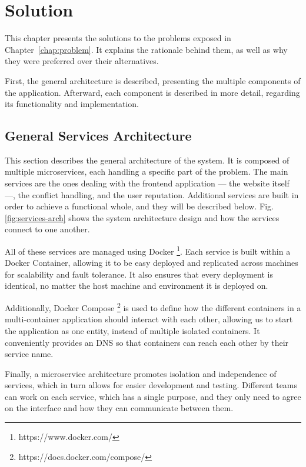 \chapter{Solution}\label{chap:solution}

This chapter presents the solutions to the problems exposed in Chapter~\ref{chap:problem}. It explains the rationale behind them, as well as why they were preferred over their alternatives.

First, the general architecture is described, presenting the multiple components of the application. Afterward, each component is described in more detail, regarding its functionality and implementation.

\section{General Services Architecture}

This section describes the general architecture of the system. It is composed of multiple microservices, each handling a specific part of the problem. The main services are the ones dealing with the frontend application --- the website itself ---, the conflict handling, and the user reputation. Additional services are built in order to achieve a functional whole, and they will be described below. Fig. \ref{fig:services-arch} shows the system architecture design and how the services connect to one another.

All of these services are managed using Docker \footnote{https://www.docker.com/}. Each service is built within a Docker Container, allowing it to be easy deployed and replicated across machines for scalability and fault tolerance. It also ensures that every deployment is identical, no matter the host machine and environment it is deployed on.

Additionally, Docker Compose \footnote{https://docs.docker.com/compose/} is used to define how the different containers in a multi-container application should interact with each other, allowing us to start the application as one entity, instead of multiple isolated containers. It conveniently provides an DNS so that containers can reach each other by their service name.

Finally, a microservice architecture promotes isolation and independence of services, which in turn allows for easier development and testing. Different teams can work on each service, which has a single purpose, and they only need to agree on the interface and how they can communicate between them.

